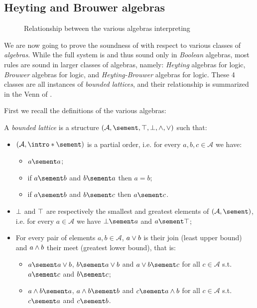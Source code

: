 \subsection{Heyting and Brouwer algebras}

\begin{figure*}
  \caption{Relationship between the various algebras interpreting }
\end{figure*}

We are now going to prove the soundness of  with respect to
various classes of \emph{algebras}. While the full system is  and thus
sound only in \emph{Boolean} algebras, most rules are sound in larger classes of
algebras, namely: \emph{Heyting} algebras for  logic,
\emph{Brouwer} algebras for  logic, and
\emph{Heyting-Brouwer} algebras for  logic. These 4 classes are
all instances of \emph{bounded lattices}, and their relationship is summarized
in the Venn  of .

First we recall the definitions of the various algebras:

\begin{definition}
  A \emph{bounded lattice} is a structure $(\mathcal{A}, \sement, \ltop, \lbot, \lmeet,
  \ljoin)$ such that:
  \begin{itemize}
    \item $(\mathcal{A}, \intro*\sement)$ is a partial order, i.e. for every $a, b, c
    \in \mathcal{A}$ we have:
      \begin{itemize}
        \item $a \sement a$;
        \item if $a \sement b$ and $b \sement a$ then $a = b$;
        \item if $a \sement b$ and $b \sement c$ then $a \sement c$.
      \end{itemize}
    \item $\bot$ and $\top$ are respectively the smallest and greatest
    elements of $(\mathcal{A}, \sement)$, i.e. for every $a \in \mathcal{A}$ we
    have $\bot \sement a$ and $a \sement \ltop$;
    \item For every pair of elements $a, b \in \mathcal{A}$, $a \lor b$ is
    their join (least upper bound) and $a \land b$ their meet (greatest lower
    bound), that is:
    \begin{itemize}
      \item $a \sement a \ljoin b$, $b \sement a \ljoin b$ and $a \ljoin b \sement c$ for all $c \in \mathcal{A}$ s.t. $a \sement c$ and $b \sement c$;
      \item $a \lmeet b \sement a$, $a \lmeet b \sement b$ and $c \sement a \lmeet b$ for all $c \in \mathcal{A}$ s.t. $c \sement a$ and $c \sement b$.
    \end{itemize}
  \end{itemize}
\end{definition}


